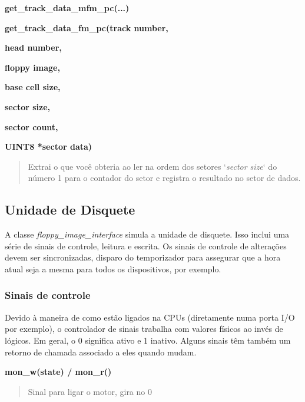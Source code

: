 \documentclass[letterpaper,10pt,brazil]{sphinxmanual}
\begin{document}
\begin{DUlineblock}{0em}
\item[] \textbf{get\_track\_data\_mfm\_pc(...)}
\item[] \textbf{get\_track\_data\_fm\_pc(track number,}
\item[]
\begin{DUlineblock}{\DUlineblockindent}
\item[] \textbf{head number,}
\item[] \textbf{floppy image,}
\item[] \textbf{base cell size,}
\item[] \textbf{sector size,}
\item[] \textbf{sector count,}
\item[] \textbf{UINT8 *sector data)}
\end{DUlineblock}
\end{DUlineblock}
\begin{quote}

Extrai o que você obteria ao ler na ordem dos setores `\emph{sector size}`
do número 1 para o contador do setor e registra o resultado no setor
de dados.
\end{quote}
\clearpage

\subsection{Unidade de Disquete}
\label{techspecs/floppy:id3}
A classe \emph{floppy\_image\_interface} simula a unidade de disquete.
Isso inclui uma série de sinais de controle, leitura e escrita.
Os sinais de controle de alterações devem ser sincronizadas, disparo
do temporizador para assegurar que a hora atual seja a mesma para
todos os dispositivos, por exemplo.


\subsubsection{Sinais de controle}
\label{techspecs/floppy:sinais-de-controle}
Devido à maneira de como estão ligados na CPUs (diretamente numa porta
I/O por exemplo), o controlador de sinais trabalha com valores físicos
ao invés de lógicos. Em geral, o 0 significa ativo e 1 inativo.
Alguns sinais têm também um retorno de chamada associado a eles quando
mudam.

\textbf{mon\_w(state) / mon\_r()}
\begin{quote}

Sinal para ligar o motor, gira no 0
\end{quote}
\end{document}
